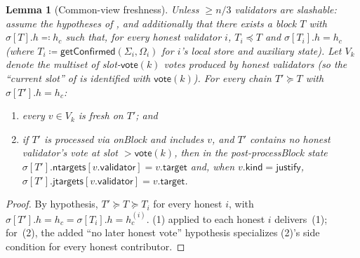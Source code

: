 \documentclass{article}
\newcommand{\target}{\mathsf{target}}
\newcommand{\kind}{\mathsf{kind}}
\newcommand{\validator}{\mathsf{validator}}
\newcommand{\just}{\ensuremath{\mathsf{justify}}\xspace}
\newcommand{\jtargets}{\mathsf{jtargets}}
\newcommand{\ntargets}{\mathsf{ntargets}}
\newcommand{\vote}{\mathsf{vote}}
\newcommand{\processBlock}{\textsf{processBlock}\xspace}
\newcommand{\onBlock}{\textsf{onBlock}\xspace}
\newcommand{\getConfirmed}{\textsf{getConfirmed}\xspace}
\theoremstyle{plain}
\newtheorem{lemma}{Lemma}
\theoremstyle{definition}
\theoremstyle{remark}
\begin{document}
\begin{lemma}[Common-view freshness]\label{lem:freshness-honest-global}
Unless $\geq n/3$ validators are slashable: assume the hypotheses of , and additionally that there exists a block $T$ with $\sigma[T].h \eqqcolon h_c$ such that, for every honest validator $i$, $T_i \preceq T$ and $\sigma[T_i].h = h_c$ (where $T_i \coloneqq \getConfirmed(\Sigma_i, \Omega_i)$ for $i$'s local store and auxiliary state).
Let $V_k$ denote the multiset of slot-$\vote(k)$ votes produced by honest validators (so the ``current slot'' of  is identified with $\vote(k)$).
For every chain $T' \succeq T$ with $\sigma[T'].h = h_c$:
\begin{enumerate}
  \item every $v \in V_k$ is fresh on $T'$; and
  \item if $T'$ is processed via \onBlock and includes $v$, and $T'$ contains no honest validator's vote at slot $> \vote(k)$, then in the post-\processBlock state $\sigma[T'].\ntargets[v.\validator] = v.\target$ and, when $v.\kind = \just$, $\sigma[T'].\jtargets[v.\validator] = v.\target$.
\end{enumerate}
\end{lemma}

\begin{proof}
By hypothesis, $T' \succeq T \succeq T_i$ for every honest $i$, with $\sigma[T'].h = h_c = \sigma[T_i].h = h_c^{(i)}$.
(1) applied to each honest $i$ delivers~(1); for~(2), the added ``no later honest vote'' hypothesis specializes (2)'s side condition for every honest contributor.
\end{proof}
\end{document}
